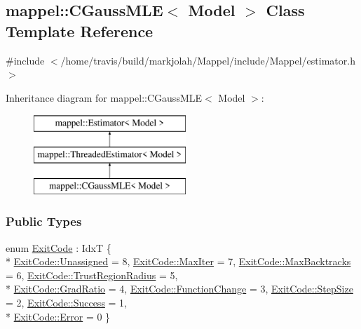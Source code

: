 \hypertarget{classmappel_1_1CGaussMLE}{}\subsection{mappel\+:\+:C\+Gauss\+M\+LE$<$ Model $>$ Class Template Reference}
\label{classmappel_1_1CGaussMLE}


{\ttfamily \#include $<$/home/travis/build/markjolah/\+Mappel/include/\+Mappel/estimator.\+h$>$}

Inheritance diagram for mappel\+:\+:C\+Gauss\+M\+LE$<$ Model $>$\+:\begin{figure}[H]
\begin{center}
\leavevmode
\includegraphics[height=3.000000cm]{classmappel_1_1CGaussMLE}
\end{center}
\end{figure}
\subsubsection*{Public Types}
\begin{DoxyCompactItemize}
\item 
enum \hyperlink{classmappel_1_1Estimator_a6d599915907ba4d0607fcb958d231edc}{Exit\+Code} \+: IdxT \{ \\*
\hyperlink{classmappel_1_1Estimator_a6d599915907ba4d0607fcb958d231edca3476bf9c3af766198bfbd4f065a51e69}{Exit\+Code\+::\+Unassigned} = 8, 
\hyperlink{classmappel_1_1Estimator_a6d599915907ba4d0607fcb958d231edcabbf52264f7a6e91c48a242f95aeed3db}{Exit\+Code\+::\+Max\+Iter} = 7, 
\hyperlink{classmappel_1_1Estimator_a6d599915907ba4d0607fcb958d231edca9e5d3183756d69b44432394db6b6fd86}{Exit\+Code\+::\+Max\+Backtracks} = 6, 
\hyperlink{classmappel_1_1Estimator_a6d599915907ba4d0607fcb958d231edcaadd208e6fbd6ef5ab84a287f259c3b81}{Exit\+Code\+::\+Trust\+Region\+Radius} = 5, 
\\*
\hyperlink{classmappel_1_1Estimator_a6d599915907ba4d0607fcb958d231edca8d0cc41d71102a7952fefe3c63244fd4}{Exit\+Code\+::\+Grad\+Ratio} = 4, 
\hyperlink{classmappel_1_1Estimator_a6d599915907ba4d0607fcb958d231edca8d75b053f108781c02ac7c22facc4338}{Exit\+Code\+::\+Function\+Change} = 3, 
\hyperlink{classmappel_1_1Estimator_a6d599915907ba4d0607fcb958d231edca071449462d0c247e47313eb8c3129dd0}{Exit\+Code\+::\+Step\+Size} = 2, 
\hyperlink{classmappel_1_1Estimator_a6d599915907ba4d0607fcb958d231edca505a83f220c02df2f85c3810cd9ceb38}{Exit\+Code\+::\+Success} = 1, 
\\*
\hyperlink{classmappel_1_1Estimator_a6d599915907ba4d0607fcb958d231edca902b0d55fddef6f8d651fe1035b7d4bd}{Exit\+Code\+::\+Error} = 0
 \}
\end{DoxyCompactItemize}
